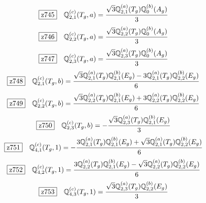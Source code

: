 \documentclass[fleqn,10pt,landscape]{jsarticle}
\begin{document}
\begin{dmath*}
\hspace*{3mm}\fbox{z745}\quad \mathbb{Q}_{2,1}^{(c)}(T_{g},a)=\frac{\sqrt{3} \mathbb{Q}_{2,1}^{(a)}(T_{g}) \mathbb{Q}_{0}^{(b)}(A_{g})}{3}
\end{dmath*}
\begin{dmath*}
\hspace*{3mm}\fbox{z746}\quad \mathbb{Q}_{2,2}^{(c)}(T_{g},a)=\frac{\sqrt{3} \mathbb{Q}_{2,2}^{(a)}(T_{g}) \mathbb{Q}_{0}^{(b)}(A_{g})}{3}
\end{dmath*}
\begin{dmath*}
\hspace*{3mm}\fbox{z747}\quad \mathbb{Q}_{2,3}^{(c)}(T_{g},a)=\frac{\sqrt{3} \mathbb{Q}_{2,3}^{(a)}(T_{g}) \mathbb{Q}_{0}^{(b)}(A_{g})}{3}
\end{dmath*}
\begin{dmath*}
\hspace*{3mm}\fbox{z748}\quad \mathbb{Q}_{2,1}^{(c)}(T_{g},b)=\frac{\sqrt{3} \mathbb{Q}_{2,1}^{(a)}(T_{g}) \mathbb{Q}_{2,1}^{(b)}(E_{g}) - 3 \mathbb{Q}_{2,1}^{(a)}(T_{g}) \mathbb{Q}_{2,2}^{(b)}(E_{g})}{6}
\end{dmath*}
\begin{dmath*}
\hspace*{3mm}\fbox{z749}\quad \mathbb{Q}_{2,2}^{(c)}(T_{g},b)=\frac{\sqrt{3} \mathbb{Q}_{2,2}^{(a)}(T_{g}) \mathbb{Q}_{2,1}^{(b)}(E_{g}) + 3 \mathbb{Q}_{2,2}^{(a)}(T_{g}) \mathbb{Q}_{2,2}^{(b)}(E_{g})}{6}
\end{dmath*}
\begin{dmath*}
\hspace*{3mm}\fbox{z750}\quad \mathbb{Q}_{2,3}^{(c)}(T_{g},b)=- \frac{\sqrt{3} \mathbb{Q}_{2,3}^{(a)}(T_{g}) \mathbb{Q}_{2,1}^{(b)}(E_{g})}{3}
\end{dmath*}
\begin{dmath*}
\hspace*{3mm}\fbox{z751}\quad \mathbb{Q}_{4,1}^{(c)}(T_{g},1)=- \frac{3 \mathbb{Q}_{2,1}^{(a)}(T_{g}) \mathbb{Q}_{2,1}^{(b)}(E_{g}) + \sqrt{3} \mathbb{Q}_{2,1}^{(a)}(T_{g}) \mathbb{Q}_{2,2}^{(b)}(E_{g})}{6}
\end{dmath*}
\begin{dmath*}
\hspace*{3mm}\fbox{z752}\quad \mathbb{Q}_{4,2}^{(c)}(T_{g},1)=\frac{3 \mathbb{Q}_{2,2}^{(a)}(T_{g}) \mathbb{Q}_{2,1}^{(b)}(E_{g}) - \sqrt{3} \mathbb{Q}_{2,2}^{(a)}(T_{g}) \mathbb{Q}_{2,2}^{(b)}(E_{g})}{6}
\end{dmath*}
\begin{dmath*}
\hspace*{3mm}\fbox{z753}\quad \mathbb{Q}_{4,3}^{(c)}(T_{g},1)=\frac{\sqrt{3} \mathbb{Q}_{2,3}^{(a)}(T_{g}) \mathbb{Q}_{2,2}^{(b)}(E_{g})}{3}
\end{dmath*}
\end{document}
